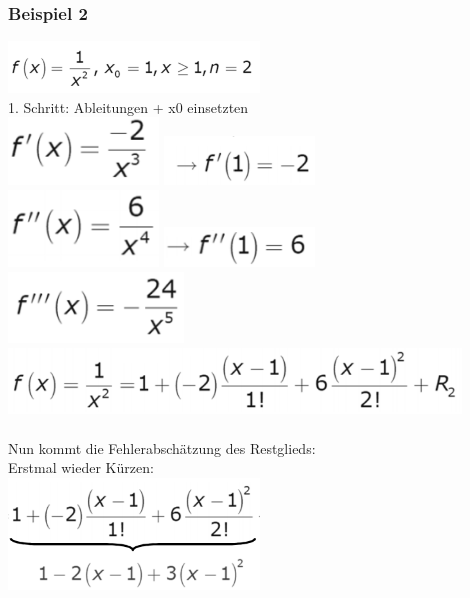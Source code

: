 \documentclass[12pt,a4paper]{article}
\begin{document}
\subsubsection{Beispiel 2}
\includegraphics[width=0.5\textwidth]{Bilder/V1/21.png}\\
1. Schritt: Ableitungen + x0 einsetzten\\
\includegraphics[width=0.3\textwidth]{Bilder/V1/22.png}
\includegraphics[width=0.3\textwidth]{Bilder/V1/22_1.png}\\
\includegraphics[width=0.3\textwidth]{Bilder/V1/23.png}
\includegraphics[width=0.3\textwidth]{Bilder/V1/23_1.png}\\
\includegraphics[width=0.35\textwidth]{Bilder/V1/24.png}
\includegraphics[width=0.9\textwidth]{Bilder/V1/25.png}\\\\
\newpage
Nun kommt die Fehlerabschätzung des Restglieds:\\
Erstmal wieder Kürzen:\\
\includegraphics[width=0.5\textwidth]{Bilder/V1/26.png}\\
\end{document}
